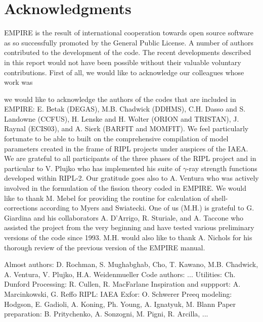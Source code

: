 \documentclass[twocolumn,amsmath,amssymb,10pt,groupedaddress,a4paper]{revtex4}
\begin{document}
\section*{Acknowledgments}

EMPIRE is the result of international cooperation towards open source software as so successfully promoted by the General Public License. A number of authors contributed to the development of the code. The recent developments described in this report would not have been possible without their valuable voluntary contributions. First of all, we would like to acknowledge our colleagues whose work was

we would like to acknowledge the authors of the codes that are included in EMPIRE: E. Betak (DEGAS), M.B. Chadwick (DDHMS), C.H. Dasso and S. Landowne (CCFUS), H. Lenske and H. Wolter (ORION and TRISTAN), J. Raynal (ECIS03), and A. Sierk (BARFIT and MOMFIT). We feel particularly fortunate to be able to built on the comprehensive compilation of model parameters created in the frame of RIPL projects under auspices of the IAEA. We are grateful to all participants of the three phases of the RIPL project and in particular to V. Plujko who has implemented his suite of $\gamma$-ray strength functions developed within RIPL-2. Our gratitude goes also to A. Ventura who was actively involved in the formulation of the fission theory coded in EMPIRE. We would like to thank M. Mebel for providing the routine for calculation of shell-corrections according to Myers and Swiatecki. One of us (M.H.) is grateful to G. Giardina and his collaborators A. D'Arrigo, R. Sturiale, and A. Taccone who assisted the project from the very beginning and have tested various preliminary versions of the code since 1993. M.H. would also like to thank A. Nichols for his thorough review of the previous version of the EMPIRE manual.

Almost authors: D. Rochman, S. Mughabghab, Cho, T. Kawano, M.B. Chadwick, A. Ventura, V. Plujko, H.A. Weidenmueller
Code authors: ...
Utilities: Ch. Dunford
Processing: R. Cullen, R. MacFarlane
Inspiration and suppport: A. Marcinkowski, G. Reffo
RIPL: IAEA
Exfor: O. Schwerer
Preeq modeling: Hodgson, E. Gadioli, A. Koning, Ph. Young, A. Ignatyuk, M. Blann
Paper preparation: B. Pritychenko, A. Sonzogni, M. Pigni, R. Arcilla, ...



\end{document}
